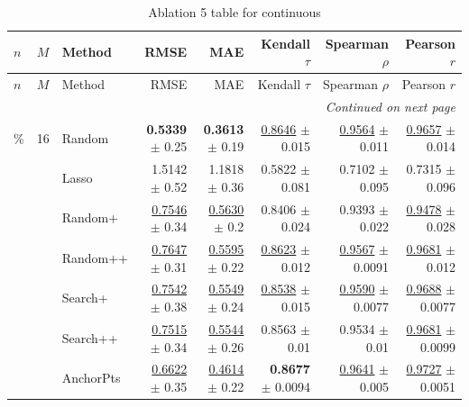 \footnotesize
\setlength{\tabcolsep}{2pt}
\renewcommand{\arraystretch}{1.05}
\setlength{\LTpre}{0pt}
\setlength{\LTpost}{0pt}
\setlength{\LTleft}{\fill}
\setlength{\LTright}{\fill}
\begin{longtable}{llp{}rrrrr}
\caption{Ablation 5 table for continuous}\label{tab:ablation\_5\_continuous}\\
\toprule
$n$ & $M$ & Method & RMSE & MAE & Kendall $\tau$ & Spearman $\rho$ & Pearson $r$ \\
\midrule
\endfirsthead
\toprule
$n$ & $M$ & Method & RMSE & MAE & Kendall $\tau$ & Spearman $\rho$ & Pearson $r$ \\
\midrule
\endhead
\midrule
\multicolumn{8}{r}{\emph{Continued on next page}} \\
\midrule
\endfoot
\bottomrule
\endlastfoot
5\% & 16 & Random & \textbf{0.5339} {\scriptsize $\pm$ 0.25} & \textbf{0.3613} {\scriptsize $\pm$ 0.19} & \underline{0.8646} {\scriptsize $\pm$ 0.015} & \underline{0.9564} {\scriptsize $\pm$ 0.011} & \underline{0.9657} {\scriptsize $\pm$ 0.014} \\
 &  & Lasso & 1.5142 {\scriptsize $\pm$ 0.52} & 1.1818 {\scriptsize $\pm$ 0.36} & 0.5822 {\scriptsize $\pm$ 0.081} & 0.7102 {\scriptsize $\pm$ 0.095} & 0.7315 {\scriptsize $\pm$ 0.096} \\
 &  & Random+ & \underline{0.7546} {\scriptsize $\pm$ 0.34} & \underline{0.5630} {\scriptsize $\pm$ 0.2} & 0.8406 {\scriptsize $\pm$ 0.024} & 0.9393 {\scriptsize $\pm$ 0.022} & \underline{0.9478} {\scriptsize $\pm$ 0.028} \\
 &  & Random++ & \underline{0.7647} {\scriptsize $\pm$ 0.31} & \underline{0.5595} {\scriptsize $\pm$ 0.22} & \underline{0.8623} {\scriptsize $\pm$ 0.012} & \underline{0.9567} {\scriptsize $\pm$ 0.0091} & \underline{0.9681} {\scriptsize $\pm$ 0.012} \\
 &  & Search+ & \underline{0.7542} {\scriptsize $\pm$ 0.38} & \underline{0.5549} {\scriptsize $\pm$ 0.24} & \underline{0.8538} {\scriptsize $\pm$ 0.015} & \underline{0.9590} {\scriptsize $\pm$ 0.0077} & \underline{0.9688} {\scriptsize $\pm$ 0.0077} \\
 &  & Search++ & \underline{0.7515} {\scriptsize $\pm$ 0.34} & \underline{0.5544} {\scriptsize $\pm$ 0.26} & 0.8563 {\scriptsize $\pm$ 0.01} & 0.9534 {\scriptsize $\pm$ 0.01} & \underline{0.9681} {\scriptsize $\pm$ 0.0099} \\
 &  & AnchorPts & \underline{0.6622} {\scriptsize $\pm$ 0.35} & \underline{0.4614} {\scriptsize $\pm$ 0.22} & \textbf{0.8677} {\scriptsize $\pm$ 0.0094} & \underline{0.9641} {\scriptsize $\pm$ 0.005} & \underline{0.9727} {\scriptsize $\pm$ 0.0051} \\

\end{longtable}
